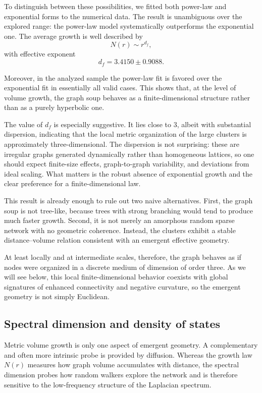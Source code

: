 \documentclass[11pt]{article}
\begin{document}
To distinguish between these possibilities, we fitted both power-law and exponential forms to the numerical data.
The result is unambiguous over the explored range: the power-law model systematically outperforms the exponential one.
The average growth is well described by
\[
N(r)\sim r^{d_f},
\]
with effective exponent
\[
d_f = 3.4150 \pm 0.9088.
\]

Moreover, in the analyzed sample the power-law fit is favored over the exponential fit in essentially all valid cases.
This shows that, at the level of volume growth, the graph soup behaves as a finite-dimensional structure rather than as a purely hyperbolic one.

The value of $d_f$ is especially suggestive.
It lies close to $3$, albeit with substantial dispersion, indicating that the local metric organization of the large clusters is approximately three-dimensional.
The dispersion is not surprising: these are irregular graphs generated dynamically rather than homogeneous lattices, so one should expect finite-size effects, graph-to-graph variability, and deviations from ideal scaling.
What matters is the robust absence of exponential growth and the clear preference for a finite-dimensional law.

This result is already enough to rule out two naive alternatives.
First, the graph soup is not tree-like, because trees with strong branching would tend to produce much faster growth.
Second, it is not merely an amorphous random sparse network with no geometric coherence.
Instead, the clusters exhibit a stable distance--volume relation consistent with an emergent effective geometry.

At least locally and at intermediate scales, therefore, the graph behaves as if nodes were organized in a discrete medium of dimension of order three.
As we will see below, this local finite-dimensional behavior coexists with global signatures of enhanced connectivity and negative curvature, so the emergent geometry is not simply Euclidean.
\subsection{Spectral dimension and density of states}
\label{sec:spectral_dimension}

Metric volume growth is only one aspect of emergent geometry.
A complementary and often more intrinsic probe is provided by diffusion.
Whereas the growth law $N(r)$ measures how graph volume accumulates with distance, the spectral dimension probes how random walkers explore the network and is therefore sensitive to the low-frequency structure of the Laplacian spectrum.
\end{document}
